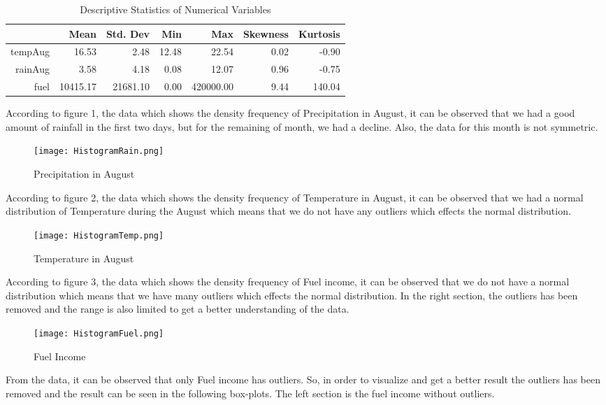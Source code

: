 \documentclass[12pt, a4]{article}
\begin{document}
\begin{table}[H]
\centering
\caption{\label{tab:table-name}Descriptive Statistics of Numerical Variables}
\begin{tabular}{rrrrrrr}
  \hline
 & Mean & Std. Dev & Min & Max & Skewness & Kurtosis \\ 
  \hline
tempAug & 16.53 & 2.48 & 12.48 & 22.54 & 0.02 & -0.90 \\ 
  rainAug & 3.58 & 4.18 & 0.08 & 12.07 & 0.96 & -0.75 \\ 
  fuel & 10415.17 & 21681.10 & 0.00 & 420000.00 & 9.44 & 140.04 \\ 
   \hline
\end{tabular}
\end{table}


According to figure 1, the data which shows the density frequency of Precipitation in August, it can be observed that we had a good amount of rainfall in the first two days, but for the remaining of month, we had a decline. Also, the data for this month is not symmetric. 

\begin{figure}[H]
\centering
\texttt{[image: HistogramRain.png]}
\caption{Precipitation in August}
\end{figure}

According to figure 2, the data which shows the density frequency of Temperature in August, it can be observed that we had a normal distribution of Temperature during the August which means that we do not have any outliers which effects the normal distribution.

\begin{figure}[H]

\texttt{[image: HistogramTemp.png]}
\caption{Temperature in August}
\end{figure}

According to figure 3, the data which shows the density frequency of Fuel income, it can be observed that we do not have a normal distribution which means that we have many outliers which effects the normal distribution. In the right section, the outliers has been removed and the range is also limited to get a better understanding of the data.

\begin{figure}[H]
\texttt{[image: HistogramFuel.png]}
\caption{Fuel Income}
\end{figure}

From the data, it can be observed that only Fuel income has outliers. So, in order to visualize and get a better result the outliers has been removed and the result can be seen in the following box-plots. The left section is the fuel income without outliers.
\end{document}

